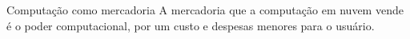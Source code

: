 \begin{frame}{Computação como mercadoria}
    A mercadoria que a computação em nuvem vende é o poder computacional, por um
    custo e despesas menores para o usuário.


\end{frame}
